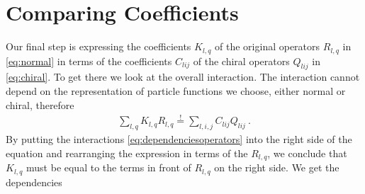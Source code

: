 \section{Comparing Coefficients}
Our final step is expressing the coefficients $K_{l,q}$ of the original operators $R_{l,q}$ in \eqref{eq:normal} in terms of the coefficients $C_{lij}$ of the chiral operators $Q_{lij}$ in \eqref{eq:chiral}. To get there we look at the overall interaction. The interaction cannot depend on the representation of particle functions we choose, either normal or chiral, therefore
\begin{align}
	\sum_{l,q} K_{l,q}R_{l,q} \overset{!}{=} \sum_{l,i,j}C_{lij}Q_{lij} \ .
\end{align}
By putting the interactions \eqref{eq:dependenciesoperators} into the right side of the equation and rearranging the expression in terms of the $R_{l,q}$, we conclude that $K_{l,q}$ must be equal to the terms in front of $R_{l,q}$ on the right side. We get the dependencies
